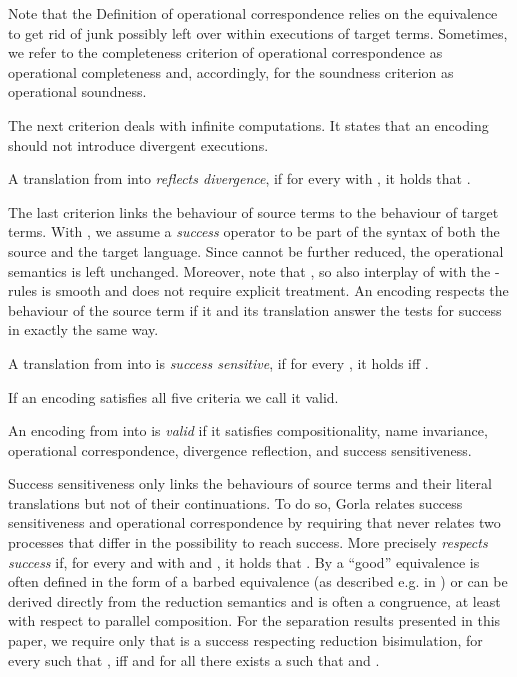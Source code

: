 \documentclass[]{article}
\begin{document}
\noindent
Note that the Definition of operational correspondence relies on the equivalence  to get rid of junk possibly left over within executions of target terms. Sometimes, we refer to the completeness criterion of operational correspondence as operational completeness and, accordingly, for the soundness criterion as operational soundness.

The next criterion deals with infinite computations. It states that an encoding should not introduce divergent executions.

	\label{divre}
	A translation  from  into  \emph{reflects divergence}, if for every  with , it holds that .
\ekrit

The last criterion links the behaviour of source terms to the behaviour of target terms. With \cite{gorla}, we assume a \emph{success} operator  to be part of the syntax of both the source and the target language.
Since  cannot be further reduced, the operational semantics is left unchanged. Moreover, note that , so also interplay of  with the -rules is smooth and does not require explicit treatment.
An encoding respects the behaviour of the source term if it and its translation answer the tests for success in exactly the same way.

	\label{succse}
	A translation  from  into  is \emph{success sensitive}, if for every , it holds  iff .
\ekrit

If an encoding satisfies all five criteria we call it valid.

\begin{definition}
	An encoding from  into  is \emph{valid} if it satisfies compositionality, name invariance, operational correspondence, divergence reflection, and success sensitiveness.
\end{definition}

Success sensitiveness only links the behaviours of source terms and their literal translations but not of their continuations. To do so, Gorla relates success sensitiveness and operational correspondence by requiring that  never relates two processes that differ in the possibility to reach success. More precisely  \emph{respects success} if, for every  and  with  and , it holds that .
By \cite{gorla} a ``good'' equivalence  is often defined in the form of a barbed equivalence (as described e.g. in \cite{milnerSangiorgi92}) or can be derived directly from the reduction semantics and is often a congruence, at least with respect to parallel composition. For the separation results presented in this paper, we require only that  is a success respecting reduction bisimulation, \ie for every  such that ,  iff  and for all  there exists a  such that  and .
\end{document}
